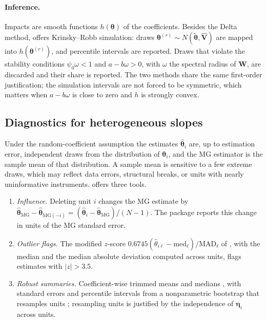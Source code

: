 \documentclass[article]{jss}
\begin{document}
\paragraph{Inference.} Impacts are smooth functions $h(\bm\theta)$ of the
coefficients. Besides the Delta method,  offers
Krinsky--Robb simulation: draws $\bm\theta^{(r)}\sim
N(\tilde{\bm\theta},\hat{\bm V})$ are mapped into $h(\bm\theta^{(r)})$, and
percentile intervals are reported. Draws that violate the stability
conditions $\psi_0\omega<1$ and $a-b\omega>0$, with $\omega$ the spectral
radius of $\bm W$, are discarded and their share is reported. The two
methods share the same first-order justification; the simulation intervals
are not forced to be symmetric, which matters when $a-b\omega$ is close to
zero and $h$ is strongly convex.

\subsection{Diagnostics for heterogeneous slopes} \label{sec:diag}

Under the random-coefficient assumption the estimates $\hat{\bm\theta}_i$
are, up to estimation error, independent draws from the distribution of
$\bm\theta_i$, and the MG estimator is the sample mean of that
distribution. A sample mean is sensitive to a few extreme draws, which may
reflect data errors, structural breaks, or units with nearly
uninformative instruments.  offers three tools.

\begin{enumerate}
\item \emph{Influence.} Deleting unit $i$ changes the MG estimate by
  $\hat{\bm\theta}_{\mathrm{MG}}-\hat{\bm\theta}_{\mathrm{MG}(-i)}=(\hat{\bm\theta}_i-\hat{\bm\theta}_{\mathrm{MG}})/(N-1)$.
  The package reports this change in units of the MG standard error.
\item \emph{Outlier flags.} The modified $z$-score
  $0.6745(\hat\theta_{i\ell}-\mathrm{med}_\ell)/\mathrm{MAD}_\ell$ of
  \citet{Iglewicz+Hoaglin:1993}, with the median and the median absolute
  deviation computed across units, flags estimates with $|z|>3.5$.
\item \emph{Robust summaries.} Coefficient-wise trimmed means and medians
  \citep{Huber+Ronchetti:2009}, with standard errors and percentile
  intervals from a nonparametric bootstrap that resamples units
  \citep{Efron+Tibshirani:1993}; resampling units is justified by the
  independence of $\bm\eta_i$ across units.
\end{enumerate}
\end{document}
